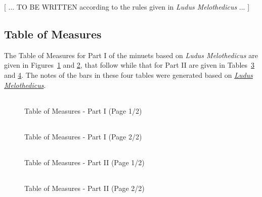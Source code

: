 \documentclass[a4paper,x11names,svgnames,10pt]{article}
\begin{document}
{[ ... TO BE WRITTEN according to the rules given in {\em Ludus Melothedicus} ... ]


\subsection{Table of Measures}\label{tabMeas}

The Table of Measures for Part I of the minuets based on {\em Ludus Melothedicus} are given in Figures~\ref{fig:meas1} and  \ref{fig:meas2}, that follow while that for Part II are given in Tables~\ref{fig:meas3} and \ref{fig:meas4}.  The notes of the bars in these four tables were generated based on \href{https://imslp.org/wiki/L'art\_de_composer\_de\_la_musique\_sans\_en\_conna\%C3\%AEtre\_les\_\%C3\%A9l\%C3\%A9ments\_(Calegari\%2C\_Antonio)}{{\em Ludus Melothedicus}}.

${}_{}$\\
\vspace{0.10in}
\begin{figure}[H]
	\centering
	\def\svgwidth{0.975\columnwidth}
	
	\caption{Table of Measures - Part I (Page 1/2)}
	\label{fig:meas1}
\end{figure}

\newpage
${}_{}$\\
\vspace{0.10in}
\begin{figure}[H]
	\centering
	\def\svgwidth{0.975\columnwidth}
	
	\caption{Table of Measures - Part I (Page 2/2)}
	\label{fig:meas2}
\end{figure}

${}_{}$\\
\vspace{0.10in}
\begin{figure}[H]
	\centering
	\def\svgwidth{0.975\columnwidth}
	
	\caption{Table of Measures - Part II (Page 1/2)}
	\label{fig:meas3}
\end{figure}

\newpage
${}_{}$\\
\vspace{0.10in}
\begin{figure}[H]
	\centering
	\def\svgwidth{0.975\columnwidth}
	
	\caption{Table of Measures - Part II (Page 2/2)}
	\label{fig:meas4}
\end{figure}



}
\end{document}
